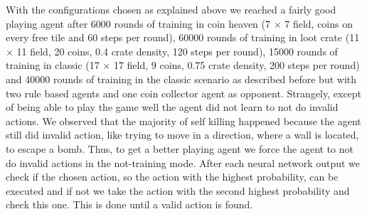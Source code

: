 With the configurations chosen as explained above we reached a fairly good playing agent after 6000 rounds of training in coin heaven (7 $\times$ 7 field, coins on every free tile and 60 steps per round), 60000 rounds of training in loot crate (11 $\times$ 11 field, 20 coins, 0.4 crate density, 120 steps per round), 15000 rounds of training in classic (17 $\times$ 17 field, 9 coins, 0.75 crate density, 200 steps per round) and 40000 rounds of training in the classic scenario as described before but with two rule based agents and one coin collector agent as opponent. Strangely, except of being able to play the game well the agent did not learn to not do invalid actions. We observed that the majority of self killing happened because the agent still did invalid action, like trying to move in a direction, where a wall is located, to escape a bomb. Thus, to get a better playing agent we force the agent to not do invalid actions in the not-training mode. After each neural network output we check if the chosen action, so the action with the highest probability, can be executed and if not we take the action with the second highest probability and check this one. This is done until a valid action is found. 

